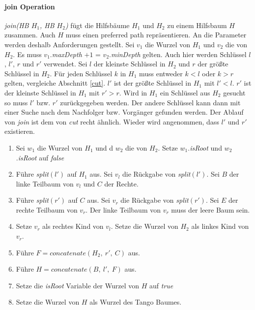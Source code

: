 \documentclass[a4paper,12pt]{article}
\begin{document}
\paragraph{join Operation}
\noindent \textit{join(HB $H_1$, HB $H_2$)} fügt die Hilfsbäume $H_1$ und $H_2$ zu einem Hilfsbaum $H$ zusammen. Auch $H$ muss einen preferred path repräsentieren. An die Parameter werden deshalb Anforderungen gestellt. Sei $v_1$ die Wurzel von $H_1$ und $v_2$ die von $H_2$. Es muss $v_1$.\textit{maxDepth} $+ 1$ =  $v_2$.\textit{minDepth} gelten. Auch hier werden Schlüssel $l$, $l'$, $r$ und $r'$ verwendet. Sei $l$ der kleinste Schlüssel in $H_2$ und $r$ der größte Schlüssel in $H_2$. 
Für jeden Schlüssel $k$ in $H_1$ muss entweder $k < l$ oder $k > r$ gelten, vergleiche Abschnitt \ref{cut}. $l'$ ist der größte Schlüssel in $H_1$ mit $l' < l$. $r'$ ist der kleinste Schlüssel in $H_1$ mit $r' > r$. Wird in $H_1$ ein Schlüssel aus $H_2$ gesucht so muss $l'$ bzw. $r'$ zurückgegeben werden. Der andere Schlüssel kann dann mit einer Suche nach dem Nachfolger bzw. Vorgänger gefunden werden. Der Ablauf von \textit{join} ist dem von \textit{cut} recht ähnlich. Wieder wird angenommen, dass $l'$ und $r'$ existieren.
\begin{enumerate}
	\item Sei $w_1$ die Wurzel von $H_1$ und d $w_2$ die von $H_2$. Setze $w_1$.\textit{isRoot} und  $w_2$.\textit{isRoot} auf \textit{false} 
	\item Führe \textit{split}$\left(l'\right)$ auf $H_1$ aus. Sei $v_l$ die Rückgabe von \textit{split}$\left(l'\right)$. Sei $B$ der linke Teilbaum von $v_l$ und $C$ der Rechte. 
	\item Führe \textit{split}$\left(r'\right)$ auf $C$ aus. Sei $v_r$ die Rückgabe von \textit{split}$\left(r'\right)$. Sei $E$ der rechte Teilbaum von $v_r$. Der linke Teilbaum von $v_r$ muss der leere Baum sein. 
	\item Setze $v_r$ als rechtes Kind von $v_l$. Setze die Wurzel von $H_2$ als linkes Kind von $v_r$.
	\item Führe $F = \textit{concatenate}\left(H_2, ~ r', ~ C \right)$ aus.
	\item Führe $H = \textit{concatenate}\left(B, ~ l',~ F \right)$ aus.
	\item Setze die \textit{isRoot} Variable der Wurzel von $H$ auf \textit{true} 
	\item Setze die Wurzel von $H$ als Wurzel des Tango Baumes. 
\end{enumerate}
\end{document}
